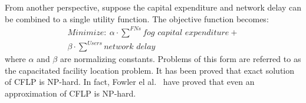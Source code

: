 \documentclass[10pt,journal,compsoc]{IEEEtran}
\begin{document}
%
%


 

From another perspective, suppose the capital expenditure and network delay can be combined to a single utility function. The objective function becomes:
\begin{align}
\textit{Minimize}: \ \alpha\cdot\overset{FNs}{\sum} \textit{fog capital expenditure} + \\
\beta \cdot \overset{Users}{\sum}\textit{network delay}\nonumber
\end{align}
where $\alpha$ and $\beta$ are normalizing constants.
Problems of this form are referred to as the capacitated facility location problem. It has been proved that exact solution of CFLP is NP-hard\cite{1984}. In fact, Fowler el al.~\cite{FOWLER1981133} have proved that even an approximation of CFLP is NP-hard.\\

\end{document}
